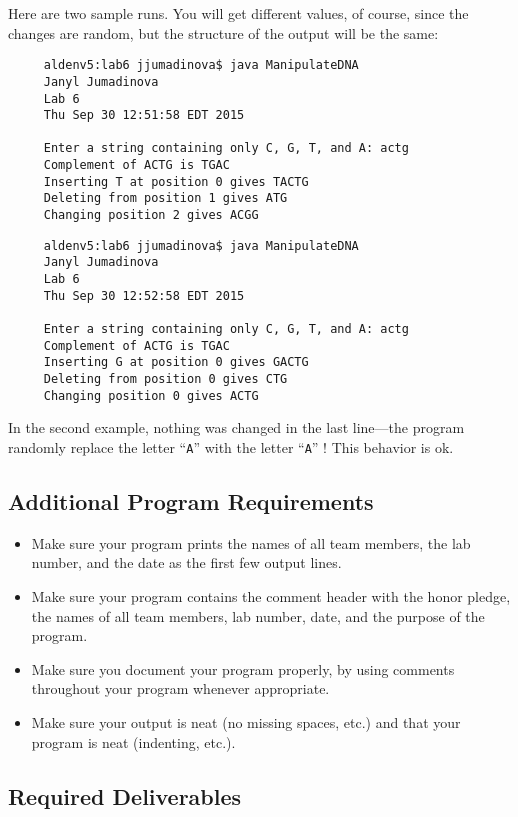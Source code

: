 Here are two sample runs. You will get different values, of course, since the
changes are random, but the structure of the output will be the same:
\begin{verbatim}
     aldenv5:lab6 jjumadinova$ java ManipulateDNA
     Janyl Jumadinova
     Lab 6
     Thu Sep 30 12:51:58 EDT 2015

     Enter a string containing only C, G, T, and A: actg
     Complement of ACTG is TGAC
     Inserting T at position 0 gives TACTG
     Deleting from position 1 gives ATG
     Changing position 2 gives ACGG
\end{verbatim}
\begin{verbatim}
     aldenv5:lab6 jjumadinova$ java ManipulateDNA
     Janyl Jumadinova
     Lab 6
     Thu Sep 30 12:52:58 EDT 2015

     Enter a string containing only C, G, T, and A: actg
     Complement of ACTG is TGAC
     Inserting G at position 0 gives GACTG
     Deleting from position 0 gives CTG
     Changing position 0 gives ACTG
\end{verbatim}

In the second example, nothing was changed in the last line---the program
randomly replace the letter ``{\tt A}'' with the letter ``{\tt A}'' !
This behavior is ok.

\vspace{-0.05in}
\subsection*{Additional Program Requirements}
\vspace{-0.05in}
\begin{itemize}
\item Make sure your program prints the names of all team members, the lab number, and the date as the first few output lines.
\item Make sure your program contains the comment header with the honor pledge, the names of all team members, lab number, date, and the purpose of the program.
\item Make sure you document your program properly, by using comments throughout your program whenever appropriate.
\item Make sure your output
is neat (no missing spaces, etc.) and that your program is neat (indenting, etc.).
\end{itemize}

\vspace{-0.05in}
\subsection*{Required Deliverables}
\vspace{-0.05in}

